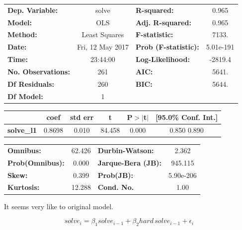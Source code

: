 \documentclass{article}
\begin{document}
\begin{center}
\begin{tabular}{lclc}
\toprule
\textbf{Dep. Variable:}    &      solve       & \textbf{  R-squared:         } &     0.965   \\
\textbf{Model:}            &       OLS        & \textbf{  Adj. R-squared:    } &     0.965   \\
\textbf{Method:}           &  Least Squares   & \textbf{  F-statistic:       } &     7133.   \\
\textbf{Date:}             & Fri, 12 May 2017 & \textbf{  Prob (F-statistic):} & 5.01e-191   \\
\textbf{Time:}             &     23:44:00     & \textbf{  Log-Likelihood:    } &   -2819.4   \\
\textbf{No. Observations:} &         261      & \textbf{  AIC:               } &     5641.   \\
\textbf{Df Residuals:}     &         260      & \textbf{  BIC:               } &     5644.   \\
\textbf{Df Model:}         &           1      & \textbf{                     } &             \\
\bottomrule
\end{tabular}
\begin{tabular}{lccccc}
                  & \textbf{coef} & \textbf{std err} & \textbf{t} & \textbf{P$>$$|$t$|$} & \textbf{[95.0\% Conf. Int.]}  \\
\midrule
\textbf{solve\_l1} &       0.8698  &        0.010     &    84.458  &         0.000        &         0.850     0.890       \\
\bottomrule
\end{tabular}
\begin{tabular}{lclc}
\textbf{Omnibus:}       & 62.426 & \textbf{  Durbin-Watson:     } &     2.362  \\
\textbf{Prob(Omnibus):} &  0.000 & \textbf{  Jarque-Bera (JB):  } &   945.115  \\
\textbf{Skew:}          &  0.399 & \textbf{  Prob(JB):          } & 5.90e-206  \\
\textbf{Kurtosis:}      & 12.288 & \textbf{  Cond. No.          } &      1.00  \\
\bottomrule
\end{tabular}
\end{center}


It seems very like to original model.

\[
solve_i = \beta_1 solve_{i-1} + \beta_2 hard \, solve_{i-1} + \epsilon_i
\]
\end{document}
